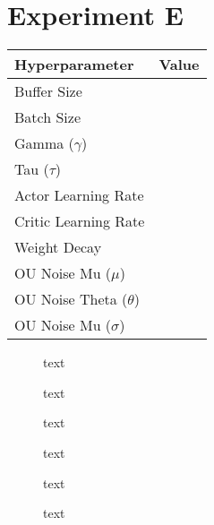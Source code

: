 \section{Experiment E}

\begin{minipage}{0.45\textwidth}
	\centering
	\begin{tabular}{lr}
	\toprule
	\textbf{Hyperparameter} & \textbf{Value} \\
	\midrule
	Buffer Size & \\
	Batch Size & \\
	Gamma ($\gamma$) & \\
	Tau ($\tau$) & \\
	Actor Learning Rate & \\
	Critic Learning Rate & \\
	Weight Decay & \\
	OU Noise Mu ($\mu$) & \\
	OU Noise Theta ($\theta$) & \\
	OU Noise Mu ($\sigma$) & \\
	\bottomrule
	\end{tabular}
\end{minipage}
\hspace{1cm}
\begin{minipage}{0.45\textwidth}
	\centering
\end{minipage}

\begin{figure}[h]
	\begin{minipage}{0.45\textwidth}
		\centering
		
		\caption{text}
		\label{fig:5501_raw_reward}
	\end{minipage}
	\hspace{0.75cm}
	\begin{minipage}{0.45\textwidth}
		\centering
		
		\caption{text}
		\label{fig:5502_average_reward}
	\end{minipage}
\end{figure}

\begin{figure}[h]
	\begin{minipage}{0.45\textwidth}
		\centering
		\caption{text}
		\label{key}
	\end{minipage}
	\hspace{1cm}
	\begin{minipage}{0.45\textwidth}
		\centering
		\caption{text}
		\label{key}
	\end{minipage}
\end{figure}

\begin{figure}[h]
	\begin{minipage}{0.45\textwidth}
		\centering
		\caption{text}
		\label{key}
	\end{minipage}
	\hspace{1cm}
	\begin{minipage}{0.45\textwidth}
		\centering
		\caption{text}
		\label{key}
	\end{minipage}
\end{figure}